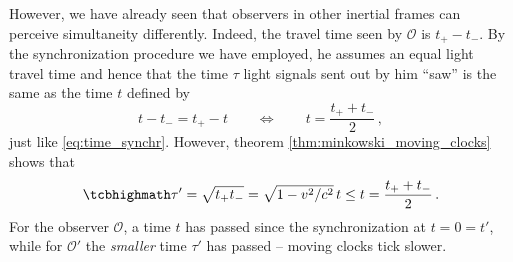 However, we have already seen that observers in other inertial frames can perceive simultaneity differently. Indeed, the travel time seen by $\mathcal{O}$ is $t_+ - t_-$. By the synchronization procedure we have employed, he assumes an equal light travel time and hence that the time $\tau$ light signals sent out by him \enquote{saw} is the same as the time $t$ defined by
\begin{equation*}
t - t_- = t_+ - t
\qquad \Leftrightarrow \qquad
t = \frac{t_+ + t_-}{2}
\, ,
\end{equation*}
just like \eqref{eq:time_synchr}. However, theorem \ref{thm:minkowski_moving_clocks} shows that
\begin{equation}
\eqbox{
\tau' = \sqrt{t_+ t_-} = \sqrt{1 - v^2 / c^2} \, t \leq t = \frac{t_+ + t_-}{2}
} \, .
\end{equation}
For the observer $\mathcal{O}$, a time $t$ has passed since the synchronization at $t = 0 = t'$, while for $\mathcal{O}'$ the \emph{smaller} time $\tau'$ has passed -- moving clocks tick slower.



